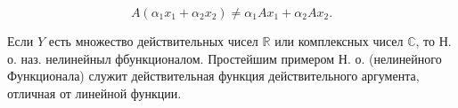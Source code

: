 \documentclass[10pt]{article}
\begin{document}
\[

A\left(\alpha_{1} x_{1}+\alpha_{2} x_{2}\right) \neq \alpha_{1} A x_{1}+\alpha_{2} A x_{2} .

\]



Если $Y$ есть множество действительных чисел $\mathbb{R}$ или комплексных чисел $\mathbb{C}$, то Н. о. наз. нелинейныл фбункционалом. Простейшим примером Н. о. (нелинейного Функционала) служит действительная функция действительного аргумента, отличная от линейной функции.
\end{document}
